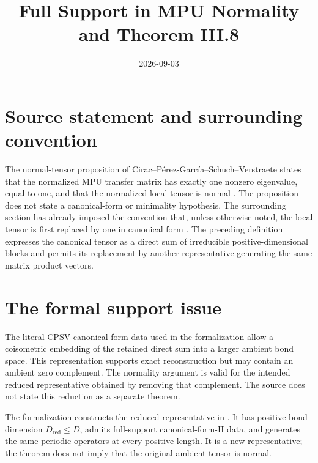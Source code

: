 \documentclass{article}
\title{Full Support in MPU Normality and Theorem III.8}
\author{}
\date{2026-09-03}
\begin{document}
\maketitle
{}

\section{Source statement and surrounding convention}

The normal-tensor proposition of
Cirac--P\'erez-Garc\'ia--Schuch--Verstraete states that the normalized MPU
transfer matrix has exactly one nonzero eigenvalue, equal to one, and that the
normalized local tensor is normal
\cite[Proposition~III.1]{Cirac2017MPU}. The proposition does not state a
canonical-form or minimality hypothesis. The surrounding section has already
imposed the convention that, unless otherwise noted, the local tensor is first
replaced by one in canonical form
\cite[discussion preceding Proposition~III.1]{Cirac2017MPU}. The preceding
definition expresses the canonical tensor as a direct sum of irreducible
positive-dimensional blocks and permits its replacement by another
representative generating the same matrix product vectors.

\section{The formal support issue}

The literal CPSV canonical-form data used in the formalization allow a
coisometric embedding of the retained direct sum into a larger ambient bond
space. This representation supports exact reconstruction but may contain an
ambient zero complement. The normality argument is valid for the intended
reduced representative obtained by removing that complement. The source does
not state this reduction as a separate theorem.

The formalization constructs the reduced representative in
. It has positive
bond dimension $D_{\mathrm{red}}\leq D$, admits full-support canonical-form-II
data, and generates the same periodic operators at every positive length. It
is a new representative; the theorem does not imply that the original ambient
tensor is normal.
\end{document}
